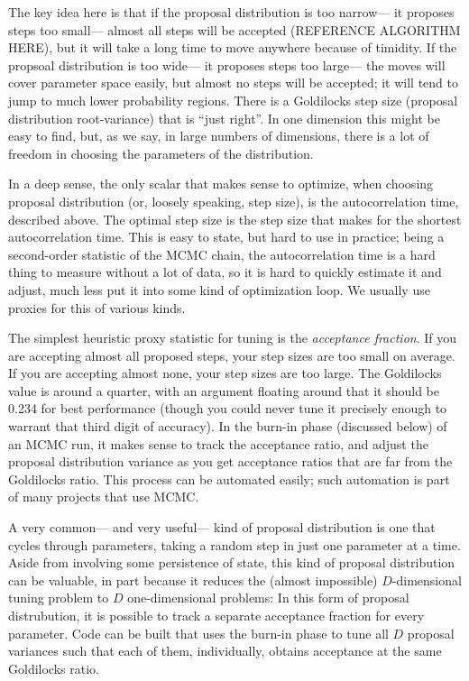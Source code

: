 \documentclass[12pt,twoside,pdftex]{article}
\begin{document}
The key idea here is that if the proposal distribution is too narrow---%
  it proposes steps too small---%
  almost all steps will be accepted (REFERENCE ALGORITHM HERE),
  but it will take a long time to move anywhere because of timidity.
If the propsoal distribution is too wide---%
  it proposes steps too large---%
  the moves will cover parameter space easily,
  but almost no steps will be accepted;
  it will tend to jump to much lower probability regions.
There is a Goldilocks step size (proposal distribution root-variance) that is ``just right''.
In one dimension this might be easy to find,
  but, as we say, in large numbers of dimensions,
  there is a lot of freedom in choosing the parameters of the distribution.
  

In a deep sense, the only scalar that makes sense to optimize,
  when choosing proposal distribution (or, loosely speaking, step size),
  is the autocorrelation time, described above.
The optimal step size is the step size that makes for the shortest autocorrelation time.
This is easy to state, but hard to use in practice;
  being a second-order statistic of the MCMC chain,
  the autocorrelation time is a hard thing to measure without a lot of data,
  so it is hard to quickly estimate it and adjust,
  much less put it into some kind of optimization loop.
We usually use proxies for this of various kinds.

The simplest heuristic proxy statistic for tuning is the \emph{acceptance fraction}.
If you are accepting almost all proposed steps, your step sizes are too small on average.
If you are accepting almost none, your step sizes are too large.
The Goldilocks value is around a quarter,
  with an argument floating around that it should be 0.234 for best performance
  (though you could never tune it precisely enough to warrant that third digit of accuracy).
In the burn-in phase (discussed below) of an MCMC run,
  it makes sense to track the acceptance ratio,
  and adjust the proposal distribution variance as you get acceptance ratios
  that are far from the Goldilocks ratio.
This process can be automated easily;
  such automation is part of many projects that use MCMC.


A very common---%
  and very useful---%
  kind of proposal distribution is one that cycles through parameters,
  taking a random step in just one parameter at a time.
Aside from involving some persistence of state,
  this kind of proposal distribution can be valuable,
  in part because it reduces the (almost impossible) $D$-dimensional tuning problem
  to $D$ one-dimensional problems:
In this form of proposal distrubution,
  it is possible to track a separate acceptance fraction for every parameter.
Code can be built that uses the burn-in phase to tune all $D$ proposal variances
  such that each of them, individually,
  obtains acceptance at the same Goldilocks ratio.
\end{document}
